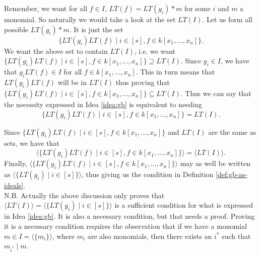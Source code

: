 \documentclass[10pt]{article}
\newcommand*{\ideal}[1]{\langle#1\rangle}
\begin{document}
Remember, we want for all $f \in I$, $LT(f) = LT(g_i) * m$ for some $i$ and $m$ a monomial. So naturally we would take a look at the set $LT(I)$. Let us form all possible $LT(g_i) * m$. It is just the set
\[
\{LT(g_i)LT(f) \mid i \in [s], f \in k[x_1, \ldots, x_n]\}.
\]
We want the above set to contain $LT(I)$, i.e. we want $\{LT(g_i)LT(f) \mid i \in [s], f \in k[x_1, \ldots, x_n]\} \supseteq LT(I)$. Since $g_i \in I$, we have that $g_iLT(f) \in I$ for all $f \in k[x_1, \ldots, x_n]$. This in turn means that $LT(g_i)LT(f)$ will be in $LT(I)$ thus proving that $\{LT(g_i)LT(f) \mid i \in [s], f \in k[x_1, \ldots, x_n]\} \subseteq LT(I)$. Thus we can say that the necessity expressed in Idea \ref{idea:gb} is equivalent to needing
\[\{LT(g_i)LT(f) \mid i \in [s], f \in k[x_1, \ldots, x_n]\} = LT(I).\]

Since $\{LT(g_i)LT(f) \mid i \in [s], f \in k[x_1, \ldots, x_n]\}$ and $LT(I)$ are the same as sets, we have that
\[\ideal{\{LT(g_i)LT(f) \mid i \in [s], f \in k[x_1, \ldots, x_n]\}} = \ideal{LT(I)}.\] Finally, $\ideal{\{LT(g_i)LT(f) \mid i \in [s], f \in k[x_1, \ldots, x_n]\}}$ may as well be written as $\ideal{\{LT(g_i) \mid i \in [s]\}}$, thus giving us the condition in Definition \ref{def:gb-as-ideals}. \\

N.B. Actually the above discussion only proves that $\ideal{LT(I)} = \ideal{\{LT(g_i) \mid i \in [s]\}}$ is a sufficient condition for what is expressed in Idea \ref{idea:gb}. It is also a necessary condition, but that needs a proof. Proving it is a necessary condition requires the observation that if we have a monomial $m \in I = \ideal{\{m_i\}}$, where $m_i$ are also monomials, then there exists an $i^*$ such that $m_{i^*} \mid m$.
%
% 
\end{document}
